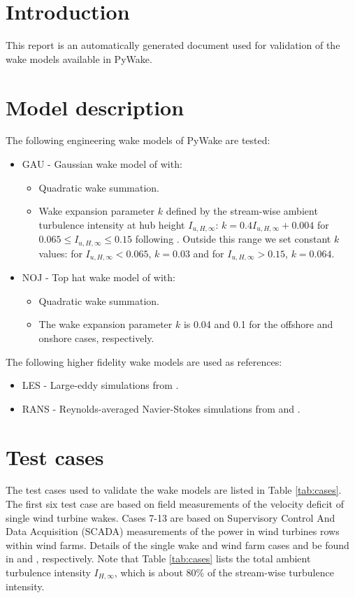 \documentclass[a4paper,oneside]{article}
\begin{document}
\section{Introduction}
This report is an automatically generated document used for validation of the wake models available in PyWake.

\section{Model description}
The following engineering wake models of PyWake are tested:
\begin{itemize}
    \item GAU - Gaussian wake model of \citet{Bastankhah2014} with:
    \begin{itemize}
        \item Quadratic wake summation.
        \item Wake expansion parameter $k$ defined by the stream-wise ambient turbulence intensity at hub height $I_{u,H,\infty}$: $k=0.4 I_{u,H,\infty} + 0.004$  for $0.065 \leq I_{u,H,\infty} \leq 0.15$ following \citet{Niayifar2015}. Outside this range we set constant $k$ values: for $I_{u,H,\infty} < 0.065$, $k=0.03$ and for $I_{u,H,\infty} > 0.15$, $k=0.064$.
    \end{itemize}
    \item NOJ - Top hat wake model of \citet{Jensen83} with:
    \begin{itemize}
        \item Quadratic wake summation.
        \item The wake expansion parameter $k$ is 0.04 and 0.1 for the offshore and onshore cases, respectively.
    \end{itemize}
\end{itemize}

The following higher fidelity wake models are used as references:
\begin{itemize}
    \item LES - Large-eddy simulations from \citet{Laan13b}.
    \item RANS - Reynolds-averaged Navier-Stokes simulations from \citet{Laan13b} and \citet{Laan14c}.
\end{itemize}


\section{Test cases}
The test cases used to validate the wake models are listed in Table \ref{tab:cases}.
The first six test case are based on field measurements of the velocity deficit of single wind turbine wakes.
Cases 7-13 are based on Supervisory Control And Data Acquisition (SCADA) measurements of the power in wind turbines rows within wind farms.
Details of the single wake and wind farm cases and be found in \citet{Laan13b} and \citet{Laan14c}, respectively.
Note that Table \ref{tab:cases} lists the total ambient turbulence intensity $I_{H,\infty}$, which is about 80\% of the stream-wise turbulence intensity.
\end{document}
